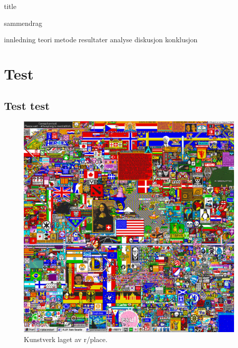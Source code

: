 



{title}
\newpage

\cleardoublepage
\tableofcontents
\newpage

{sammendrag}


{innledning}
{teori}
{metode}
{resultater}
{analyse}
{diskusjon}
{konklusjon}

\section{Test}
\subsection{Test test}

\begin{figure}[h]\label{r/place}
    \centering
    \includegraphics[width=.6\textwidth]{img/r_place.png}
    \caption{Kunstverk laget av r/place.}
\end{figure}

\newpage

\printbibliography[heading=bibintoc]
\listoffigures
\listoftables
\lstlistoflistings
{}

